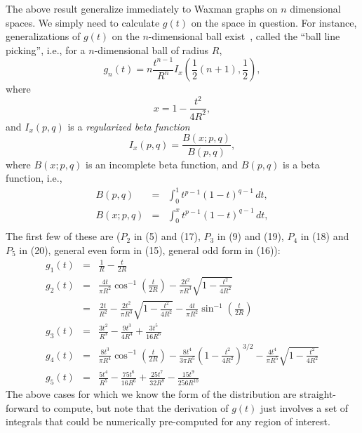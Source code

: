 \documentclass{article}
\begin{document}
The above result generalize immediately to Waxman graphs on $n$
dimensional spaces. We simply need to calculate $g(t)$ on the space in
question. For instance, generalizations of $g(t)$ on the
$n$-dimensional ball exist~\cite{tu00:_circle_line}, called the ``ball
line picking'', i.e., for a $n$-dimensional ball of radius $R$,
\[ g_n(t) = n \frac{t^{n-1}}{R^n} I_x\left( 
  \frac{1}{2} (n+1), \frac{1}{2}
                      \right),
\]
where
\[ x = 1 - \frac{t^2}{4 R^2}, \]
and $I_x(p,q)$ is a {\em regularized beta function}
\[  I_x(p,q) = \frac{ B(x; p,q)}{B(p,q)}, \]
where $B(x; p,q)$ is an incomplete beta function, and $B(p,q)$ is a
beta function, i.e., 
\begin{eqnarray*}
  B(p,q)    & = & \int_0^1 t^{p-1} (1 - t)^{q-1} \, dt, \\
  B(x; p,q) & = & \int_0^x t^{p-1} (1 - t)^{q-1} \, dt, \\
\end{eqnarray*}
The first few of these are \cite{tu00:_circle_line} ($P_2$ in (5) and
(17), $P_3$ in (9) and (19), $P_4$ in (18) and $P_5$ in (20), general
even form in (15), general odd form in (16)):
\begin{eqnarray}
  \label{eq:ball_line_picking}
  g_1(t) & = & \frac{1}{R} - \frac{t}{2 R}   \label{eq:line_line_picking} \\
  g_2(t) & = & \frac{4 t}{\pi R^2} \cos^{-1} \left( \frac{t}{2R} \right) 
               - \frac{2 t^2}{\pi R^3} \sqrt{1 - \frac{t^2}{4 R^2} } \label{eq:2dball_line_picking} \\
          & = & \frac{2 t}{R^2} 
               - \frac{2 t^2}{\pi R^3} \sqrt{1 - \frac{t^2}{4 R^2} }
               - \frac{4 t}{\pi R^2} \sin^{-1} \left( \frac{t}{2R} \right) \label{eq:2dball_line_picking2}  \\
  g_3(t) & = & \frac{3 t^2}{R^3} - \frac{9 t^3}{4 R^4} + \frac{3 t^5}{16 R^6}   \label{eq:sphere_line_picking}  \\
  g_4(t) & = &  \frac{8 t^3}{\pi R^4} \cos^{-1} \left( \frac{t}{2R} \right) 
               - \frac{8 t^4}{3 \pi R^5} \left( 1 - \frac{t^2}{4 R^2} \right)^{3/2}
               - \frac{4 t^4}{\pi R^5} \sqrt{1 - \frac{t^2}{4 R^2} } \\
  g_5(t) & = & \frac{5 t^4}{R^5} - \frac{75 t^6}{16 R^6} + \frac{25 t^7}{32 R^8} - \frac{15 t^9}{256 R^{10}}  
  \label{eq:ball_line_picking-end}
\end{eqnarray}
The above cases for which we know the form of the distribution are
straight-forward to compute, but note that the derivation of $g(t)$
just involves a set of integrals that could be numerically
pre-computed for any region of interest.  
 
\end{document}
